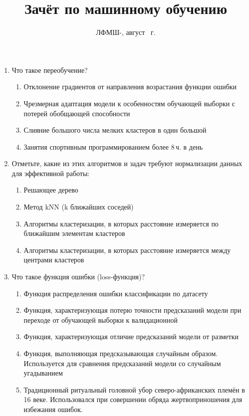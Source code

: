 \documentclass[a4paper,10pt]{article}
\title{Зачёт по машинному обучению}
\date{ЛФМШ-\arabic{LFMSHnumber}, август {\the \year}~г.}
\begin{document}
\maketitle
\begin{enumerate}
	\item Что такое переобучение?
	\begin{enumerate}
		\item Отклонение градиентов от направления возрастания функции ошибки
		\item Чрезмерная адаптация модели к особенностям обучающей выборки с потерей обобщающей способности
		\item Слияние большого числа мелких кластеров в один большой
		\item Занятия спортивным программированием более 8\,ч. в день
	\end{enumerate}

	\item Отметьте, какие из этих алгоритмов и задач требуют нормализации данных для эффективной работы:
	\begin{enumerate}
		\item Решающее дерево
		\item Метод kNN (k ближайших соседей)
		\item Алгоритмы кластеризации, в которых расстояние измеряется по ближайшим элементам кластеров
		\item Алгоритмы кластеризации, в которых расстояние измеряется между центрами кластеров
	\end{enumerate}
	
	\item Что такое функция ошибки (loss-функция)?
	\begin{enumerate}
		\item Функция распределения ошибки классификации по датасету
		\item Функция, характеризующая потерю точности предсказаний модели при переходе от обучающей выборки к валидационной
		\item Функция, характеризующая отличие предсказаний модели от разметки
		\item Функция, выполняющая предсказывающая случайным образом. Используется для сравнения предсказаний модели со случайным угадыванием
		\item Традиционный ритуальный головной убор северо-африканских племён в 16 веке. Использовался при совершении обряда жертвоприношения для избежания ошибок.
	\end{enumerate} 
		

\end{enumerate}
\end{document}
